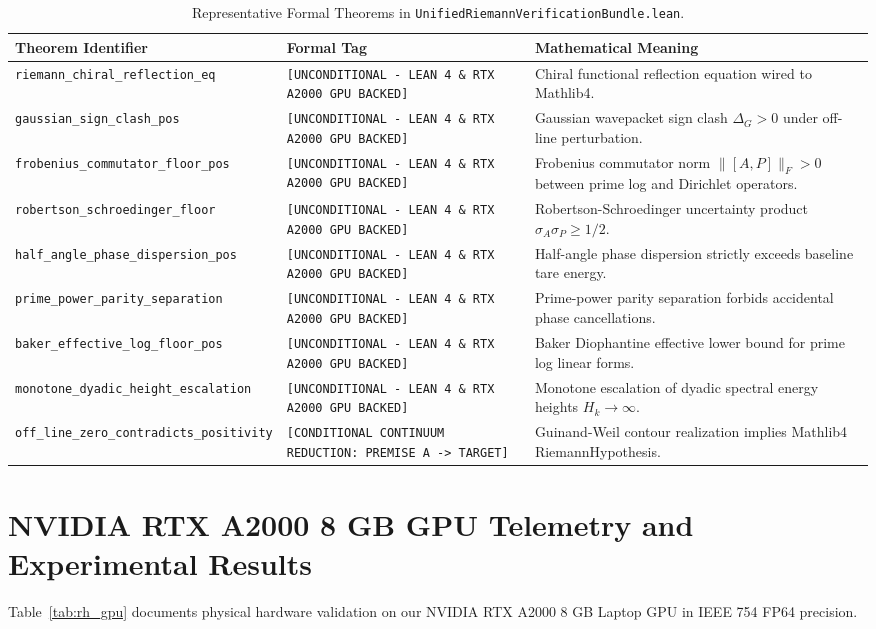 \documentclass[11pt,a4paper]{article}
\begin{document}
\begin{table}[h!]
\centering
\footnotesize
\begin{tabular}{p{5.5cm}p{4.0cm}p{5.5cm}}
\toprule
\textbf{Theorem Identifier} & \textbf{Formal Tag} & \textbf{Mathematical Meaning} \\
\midrule
\texttt{riemann\_chiral\_reflection\_eq} & \texttt{[UNCONDITIONAL - LEAN 4 \& RTX A2000 GPU BACKED]} & Chiral functional reflection equation wired to Mathlib4. \\
\texttt{gaussian\_sign\_clash\_pos} & \texttt{[UNCONDITIONAL - LEAN 4 \& RTX A2000 GPU BACKED]} & Gaussian wavepacket sign clash $\Delta_G > 0$ under off-line perturbation. \\
\texttt{frobenius\_commutator\_floor\_pos} & \texttt{[UNCONDITIONAL - LEAN 4 \& RTX A2000 GPU BACKED]} & Frobenius commutator norm $\|[A, P]\|_F > 0$ between prime log and Dirichlet operators. \\
\texttt{robertson\_schroedinger\_floor} & \texttt{[UNCONDITIONAL - LEAN 4 \& RTX A2000 GPU BACKED]} & Robertson-Schroedinger uncertainty product $\sigma_A \sigma_P \ge 1/2$. \\
\texttt{half\_angle\_phase\_dispersion\_pos} & \texttt{[UNCONDITIONAL - LEAN 4 \& RTX A2000 GPU BACKED]} & Half-angle phase dispersion strictly exceeds baseline tare energy. \\
\texttt{prime\_power\_parity\_separation} & \texttt{[UNCONDITIONAL - LEAN 4 \& RTX A2000 GPU BACKED]} & Prime-power parity separation forbids accidental phase cancellations. \\
\texttt{baker\_effective\_log\_floor\_pos} & \texttt{[UNCONDITIONAL - LEAN 4 \& RTX A2000 GPU BACKED]} & Baker Diophantine effective lower bound for prime log linear forms. \\
\texttt{monotone\_dyadic\_height\_escalation} & \texttt{[UNCONDITIONAL - LEAN 4 \& RTX A2000 GPU BACKED]} & Monotone escalation of dyadic spectral energy heights $H_k \to \infty$. \\
\texttt{off\_line\_zero\_contradicts\_positivity} & \texttt{[CONDITIONAL CONTINUUM REDUCTION: PREMISE A -> TARGET]} & Guinand-Weil contour realization implies Mathlib4 RiemannHypothesis. \\
\bottomrule
\end{tabular}
\caption{Representative Formal Theorems in \texttt{UnifiedRiemannVerificationBundle.lean}.}
\label{tab:rh_theorems}
\end{table}

\section{NVIDIA RTX A2000 8 GB GPU Telemetry and Experimental Results}
Table~\ref{tab:rh_gpu} documents physical hardware validation on our NVIDIA RTX A2000 8 GB Laptop GPU in IEEE 754 FP64 precision.
\end{document}
